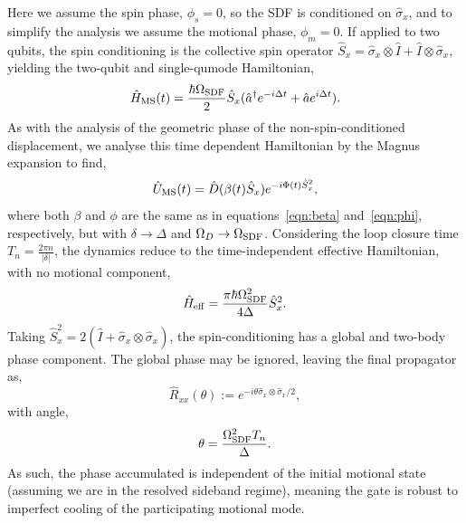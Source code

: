 Here we assume the spin phase, $\phi_s = 0$, so the SDF is conditioned on $\hat \sigma_x$, and to simplify the analysis we assume the motional phase, $\phi_m = 0$.
If applied to two qubits, the spin conditioning is the collective spin operator $\hat S_{x}=\hat\sigma_x\otimes \hat I + \hat I\otimes\hat\sigma_x$, yielding the two-qubit and single-qumode Hamiltonian,
\begin{equation}
    \hat H_{\rm MS}(t) = \frac{\hbar \Omega_{\rm SDF}}{2}\hat S_{x}(\hat a^\dagger e^{-i\Delta t}+\hat a e^{i\Delta t}).
\end{equation}
As with the analysis of the geometric phase of the non-spin-conditioned displacement, we analyse this time dependent Hamiltonian by the Magnus expansion to find,
\begin{equation}
    \hat U_{\rm MS}(t) = \hat D(\beta(t)\hat S_{x})e^{-i\Phi(t)\hat S_{x}^2},
\end{equation}
where both $\beta$ and $\phi$ are the same as in equations~\ref{eqn:beta} and~\ref{eqn:phi}, respectively, but with $\delta\rightarrow\Delta$ and $\Omega_D\rightarrow\Omega_{\rm SDF}$.
Considering the loop closure time $T_n = \frac{2\pi n}{|\delta|}$, the dynamics reduce to the time-independent effective Hamiltonian, with no motional component,
\begin{equation}
    \hat H_{\rm eff} = \frac{\pi\hbar\Omega_{\rm SDF}^2}{4\Delta}\hat S_x^2.
\end{equation}
Taking $\hat S_x^2 = 2(\hat I + \hat\sigma_x\otimes\hat\sigma_x)$, the spin-conditioning has a global and two-body phase component. The global phase may be ignored, leaving the final propagator as,
\begin{equation}
    \hat R_{xx}(\theta) := e^{-i\theta\hat\sigma_x\otimes\hat\sigma_x/2},
\end{equation}
with angle,
\begin{equation}
\theta = \frac{\Omega_{\rm SDF}^2T_n}{\Delta}.
\end{equation}
As such, the phase accumulated is independent of the initial motional state (assuming we are in the resolved sideband regime), meaning the gate is robust to imperfect cooling of the participating motional mode.

